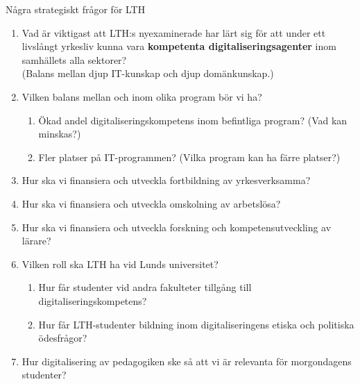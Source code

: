 \documentclass[aspectratio=169]{beamer}
\newenvironment{Slide}[1]%
  {\begin{frame}[environment=Slide]{#1}}
  {\end{frame}}%
\begin{document}
\begin{Slide}{Några strategiskt frågor för LTH}
  \begin{enumerate}\small
    \item Vad är viktigast att LTH:s nyexaminerade har lärt sig för att under ett livslångt yrkesliv kunna vara \textbf{kompetenta digitaliseringsagenter} inom samhällets alla sektorer? \\(Balans mellan djup IT-kunskap och djup domänkunskap.)
    \item Vilken balans mellan och inom olika program bör vi ha?
    \begin{enumerate}
      \item Ökad andel digitaliseringskompetens inom befintliga program? (Vad kan minskas?)
      \item Fler platser på IT-programmen? (Vilka program kan ha färre platser?)
    \end{enumerate}  
    \item Hur ska vi finansiera och utveckla fortbildning av yrkesverksamma?
    \item Hur ska vi finansiera och utveckla omskolning av arbetslösa?
    \item Hur ska vi finansiera och utveckla  forskning och kompetensutveckling av lärare?
    \item Vilken roll ska LTH ha vid Lunds universitet?
    \begin{enumerate}
      \item Hur får studenter vid andra fakulteter tillgång till digitaliseringskompetens?
      \item Hur får LTH-studenter bildning inom digitaliseringens etiska och politiska ödesfrågor?
    \end{enumerate}  
    \item Hur digitalisering av pedagogiken ske så att vi är relevanta för morgondagens studenter?
  \end{enumerate}  
\end{Slide}
\end{document}
